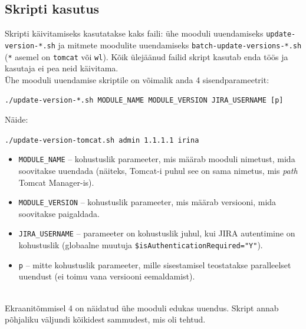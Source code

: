 \documentclass[12pt]{report}
\newcommand{\code}[1]{\texttt{#1}}
\begin{document}
  \subsection{Skripti kasutus}
  
  Skripti käivitamiseks kasutatakse kaks faili: ühe mooduli uuendamiseks \code{update-version-*.sh} ja mitmete moodulite uuendamiseks \code{batch-update-versions-*.sh} (\code{*} asemel on \code{tomcat} või \code{wl}). Kõik ülejäänud failid skript kasutab enda töös ja kasutaja ei pea neid käivitama.\\
  
  Ühe mooduli uuendamise skriptile on võimalik anda 4 sisendparameetrit:
  \begin{center}
    \small{\code{./update-version-*.sh MODULE\_NAME MODULE\_VERSION JIRA\_USERNAME [p]}}
  \end{center}
  
  Näide:
  \begin{center}
    \small{\code{./update-version-tomcat.sh admin 1.1.1.1 irina}}
  \end{center}

  \begin{itemize}
    \item \code{MODULE\_NAME} \--- kohustuslik parameeter, mis määrab mooduli nimetust, mida soovitakse uuendada (näiteks, Tomcat-i puhul see on sama nimetus, mis \textit{path} Tomcat Manager-is).
    \item \code{MODULE\_VERSION} \--- kohustuslik parameeter, mis määrab versiooni, mida soovitakse paigaldada.
    \item \code{JIRA\_USERNAME} \--- parameeter on kohustuslik juhul, kui JIRA autentimine on kohustuslik (globaalne muutuja \code{\$isAuthenticationRequired="Y"}).
    \item \code{p} \--- mitte kohustuslik parameeter, mille sisestamisel teostatakse paralleelset uuendust (ei toimu vana versiooni eemaldamist).
  \end{itemize}\\
  
  Ekraanitõmmisel 4 on näidatud ühe mooduli edukas uuendus. Skript annab põhjaliku väljundi kõikidest sammudest, mis oli tehtud.
  
\end{document}
